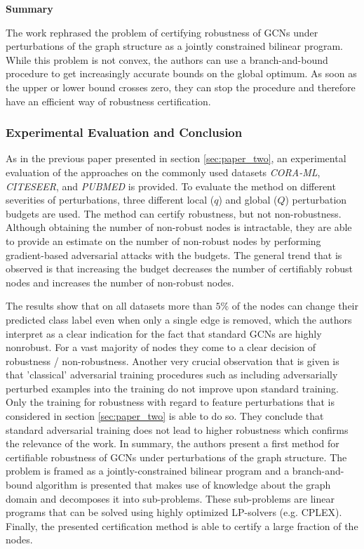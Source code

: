 \documentclass[a4paper,preprint]{sig-alternate}
\begin{document}
\textbf{Summary}\newline

The work rephrased the problem of certifying robustness of GCNs under perturbations of the graph structure
as a jointly constrained bilinear program. While this problem is not convex, the authors can use a branch-and-bound procedure to get increasingly
accurate bounds on the global optimum. As soon as the upper or lower bound crosses zero, they can stop the procedure
and therefore have an efficient way of robustness certification.

\subsubsection{Experimental Evaluation and Conclusion}

As in the previous paper presented in section \ref{sec:paper_two}, an experimental evaluation of the approaches on the commonly used
datasets \textit{CORA-ML}, \textit{CITESEER}, and \textit{PUBMED} is provided.
To evaluate the method on different severities of perturbations, three different local ($q$) and global ($Q$) perturbation budgets are used. 
The method can certify robustness, but not non-robustness. Although obtaining the number of non-robust nodes is intractable, they
are able to provide an estimate on the number of non-robust nodes by performing gradient-based adversarial attacks with the budgets.
The general trend that is observed is that increasing the budget decreases the number of certifiably robust nodes and increases
the number of non-robust nodes.

The results show that on all datasets more than $5\%$ of the nodes can change their predicted class label even when only a single 
edge is removed, which the authors interpret as a clear indication for the fact that standard GCNs are highly nonrobust.
For a vast majority of nodes they come to a clear decision of robustness / non-robustness.\newline
Another very crucial observation that is given is that 'classical' adversarial training procedures such as including adversarially
perturbed examples into the training do not improve upon standard training. Only the training for robustness with regard to feature
perturbations that is considered in section \ref{sec:paper_two} is able to do so. They conclude that standard adversarial training does not 
lead to higher robustness which confirms the relevance of the work.\newline
In summary, the authors present a first method for certifiable robustness of GCNs under perturbations of the graph structure.
The problem is framed as a jointly-constrained bilinear program and a branch-and-bound algorithm is presented that makes 
use of knowledge about the graph domain and decomposes it into sub-problems.
These sub-problems are linear programs that can be solved using highly optimized LP-solvers (e.g. CPLEX).
Finally, the presented certification method is able to certify a large fraction of the nodes.
\end{document}
